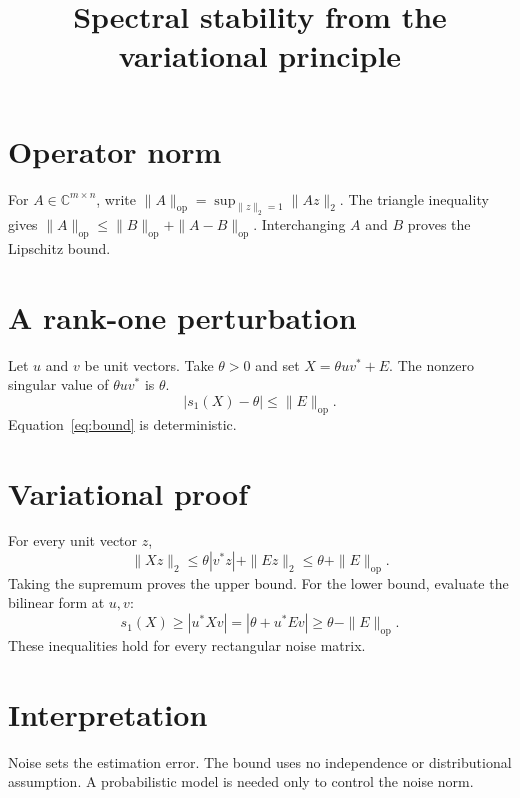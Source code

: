 \documentclass[11pt]{article}
\title{Spectral stability from the variational principle}
\author{}\date{}
\begin{document}
\maketitle
\section{Operator norm}
For $A\in\mathbb C^{m\times n}$, write
$\|A\|_{\mathrm{op}}=\sup_{\|z\|_2=1}\|Az\|_2$.
The triangle inequality gives
$\|A\|_{\mathrm{op}}\leq\|B\|_{\mathrm{op}}+\|A-B\|_{\mathrm{op}}$.
Interchanging $A$ and $B$ proves the Lipschitz bound.
\section{A rank-one perturbation}
Let $u$ and $v$ be unit vectors.
Take $\theta>0$ and set $X=\theta uv^*+E$.
The nonzero singular value of $\theta uv^*$ is $\theta$.
\begin{equation}\label{eq:bound}
  |s_1(X)-\theta|\leq\|E\|_{\mathrm{op}}.
\end{equation}
Equation~\eqref{eq:bound} is deterministic.
\section{Variational proof}
For every unit vector $z$,
\[\|Xz\|_2\leq\theta|v^*z|+\|Ez\|_2
  \leq\theta+\|E\|_{\mathrm{op}}.\]
Taking the supremum proves the upper bound.
For the lower bound, evaluate the bilinear form at $u,v$:
\[s_1(X)\geq|u^*Xv|=|\theta+u^*Ev|
  \geq\theta-\|E\|_{\mathrm{op}}.\]
These inequalities hold for every rectangular noise matrix.
\section{Interpretation}
Noise sets the estimation error.
The bound uses no independence or distributional assumption.
A probabilistic model is needed only to control the noise norm.
\end{document}
